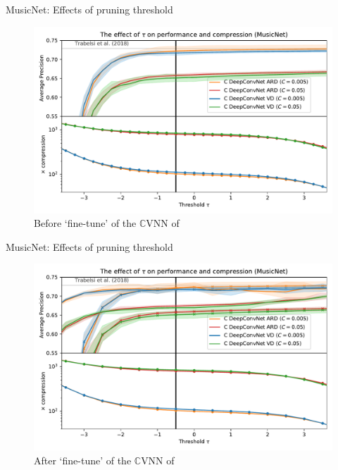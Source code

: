 \documentclass{beamer}
\newcommand{\cplx}{\mathbb{C}}
\begin{document}
\begin{frame}[c]{MusicNet: Effects of pruning threshold}
  \begin{figure}[t]
    \centering
    \includegraphics[width=\linewidth]{figure__musicnet__threshold.pdf}
    \\
    {Before `fine-tune' of the $\cplx$VNN of \citet{trabelsi_deep_2018}}
  \end{figure}

\end{frame}

\begin{frame}[c]{MusicNet: Effects of pruning threshold}
  \begin{figure}[t]
    \centering
    \includegraphics[width=\linewidth]{figure__musicnet__threshold__fine-tune.pdf}
    \\
    {After `fine-tune' of the $\cplx$VNN of \citet{trabelsi_deep_2018}}
  \end{figure}

\end{frame}
\end{document}

